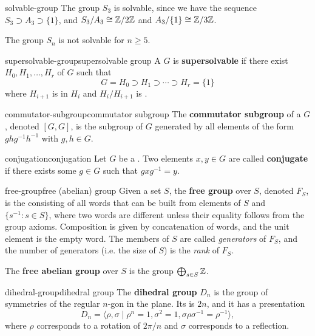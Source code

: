 \begin{example}{solvable-group}
    The group $S_3$ is solvable, since we have the sequence $S_3 \supset A_3 \supset \{ 1 \}$, and $S_3 / A_3 \cong \mathbb{Z}/2\mathbb{Z}$ and $A_3/\{ 1 \} \cong \mathbb{Z}/3\mathbb{Z}$.
    
    The group $S_n$ is not solvable for $n \ge 5$.
\end{example}

\begin{topic}{supersolvable-group}{supersolvable group}
    A  $G$ is \textbf{supersolvable} if there exist  $H_0, H_1, \ldots, H_r$ of $G$ such that
    \[ G = H_0 \supset H_1 \supset \cdots \supset H_r = \{ 1 \} \]
    where $H_{i + 1}$ is  in $H_i$ and $H_i/H_{i + 1}$ is .
\end{topic}

\begin{topic}{commutator-subgroup}{commutator subgroup}
    The \textbf{commutator subgroup} of a  $G$, denoted $[G, G]$, is the subgroup of $G$ generated by all elements of the form $ghg^{-1}h^{-1}$ with $g, h \in G$.
\end{topic}

\begin{topic}{conjugation}{conjugation}
    Let $G$ be a . Two elements $x, y \in G$ are called \textbf{conjugate} if there exists some $g \in G$ such that $g x g^{-1} = y$.
\end{topic}

\begin{topic}{free-group}{free (abelian) group}
    Given a set $S$, the \textbf{free group} over $S$, denoted $F_S$, is the  consisting of all words that can be built from elements of $S$ and $\{ s^{-1} : s \in S \}$, where two words are different unless their equality follows from the group axioms. Composition is given by concatenation of words, and the unit element is the empty word. The members of $S$ are called \textit{generators} of $F_S$, and the number of generators (i.e. the size of $S$) is the \textit{rank} of $F_S$.

    The \textbf{free abelian group} over $S$ is the  group $\bigoplus_{s \in S} \mathbb{Z}$.
\end{topic}

\begin{topic}{dihedral-group}{dihedral group}
    The \textbf{dihedral group} $D_n$ is the group of symmetries of the regular $n$-gon in the plane. Its  is $2n$, and it has a presentation
    \[ D_n = \langle \rho, \sigma \mid \rho^n = 1, \sigma^2 = 1, \sigma \rho \sigma^{-1} = \rho^{-1} \rangle , \]
    where $\rho$ corresponds to a rotation of $2 \pi / n$ and $\sigma$ corresponds to a reflection.
\end{topic}

